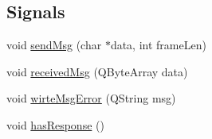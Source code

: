 \subsection*{Signals}
\begin{DoxyCompactItemize}
\item 
void \mbox{\hyperlink{class_serial_port_thread_afe967fd379bdd7b5d7cb90292ff18c32}{send\+Msg}} (char $\ast$data, int frame\+Len)
\item 
void \mbox{\hyperlink{class_serial_port_thread_ac076c2d960a1464de8e88e703ad00dc5}{received\+Msg}} (Q\+Byte\+Array data)
\item 
void \mbox{\hyperlink{class_serial_port_thread_a7ba1cacdedbb7c158750553adbd13669}{wirte\+Msg\+Error}} (Q\+String msg)
\item 
void \mbox{\hyperlink{class_serial_port_thread_aa052196772f8d1a3066030c4b10eb18d}{has\+Response}} ()
\end{DoxyCompactItemize}
